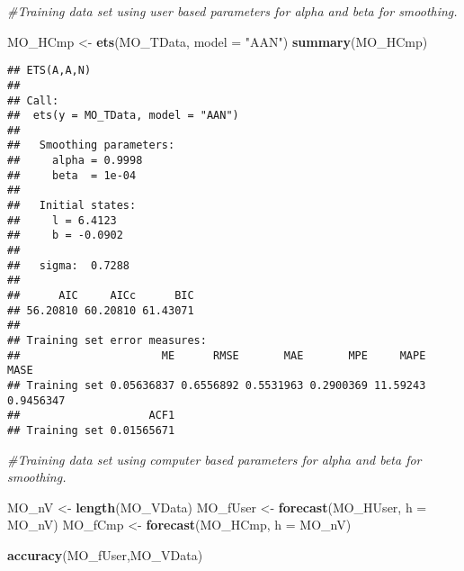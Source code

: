 \documentclass[
]{article}
\newenvironment{Shaded}{\begin{snugshade}}{\end{snugshade}}
\newcommand{\CommentTok}[1]{\textcolor[rgb]{0.56,0.35,0.01}{\textit{#1}}}
\newcommand{\DataTypeTok}[1]{\textcolor[rgb]{0.13,0.29,0.53}{#1}}
\newcommand{\KeywordTok}[1]{\textcolor[rgb]{0.13,0.29,0.53}{\textbf{#1}}}
\newcommand{\NormalTok}[1]{#1}
\newcommand{\StringTok}[1]{\textcolor[rgb]{0.31,0.60,0.02}{#1}}
\begin{document}
\begin{Shaded}
\begin{Highlighting}[]
\CommentTok{#Training data set using user based parameters for alpha and beta for smoothing.}
\end{Highlighting}
\end{Shaded}

\begin{Shaded}
\begin{Highlighting}[]
\NormalTok{MO_HCmp <-}\StringTok{ }\KeywordTok{ets}\NormalTok{(MO_TData, }\DataTypeTok{model =} \StringTok{"AAN"}\NormalTok{)}
\KeywordTok{summary}\NormalTok{(MO_HCmp)}
\end{Highlighting}
\end{Shaded}

\begin{verbatim}
## ETS(A,A,N) 
## 
## Call:
##  ets(y = MO_TData, model = "AAN") 
## 
##   Smoothing parameters:
##     alpha = 0.9998 
##     beta  = 1e-04 
## 
##   Initial states:
##     l = 6.4123 
##     b = -0.0902 
## 
##   sigma:  0.7288
## 
##      AIC     AICc      BIC 
## 56.20810 60.20810 61.43071 
## 
## Training set error measures:
##                      ME      RMSE       MAE       MPE     MAPE      MASE
## Training set 0.05636837 0.6556892 0.5531963 0.2900369 11.59243 0.9456347
##                    ACF1
## Training set 0.01565671
\end{verbatim}

\begin{Shaded}
\begin{Highlighting}[]
\CommentTok{#Training data set using computer based parameters for alpha and beta for smoothing.}
\end{Highlighting}
\end{Shaded}

\begin{Shaded}
\begin{Highlighting}[]
\NormalTok{MO_nV <-}\StringTok{ }\KeywordTok{length}\NormalTok{(MO_VData)}
\NormalTok{MO_fUser <-}\StringTok{ }\KeywordTok{forecast}\NormalTok{(MO_HUser, }\DataTypeTok{h =}\NormalTok{ MO_nV)}
\NormalTok{MO_fCmp <-}\StringTok{ }\KeywordTok{forecast}\NormalTok{(MO_HCmp, }\DataTypeTok{h =}\NormalTok{ MO_nV)}
\end{Highlighting}
\end{Shaded}

\begin{Shaded}
\begin{Highlighting}[]
\KeywordTok{accuracy}\NormalTok{(MO_fUser,MO_VData)}
\end{Highlighting}
\end{Shaded}
\end{document}
